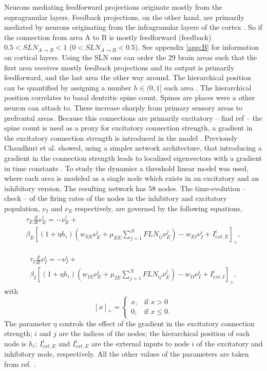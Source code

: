 Neurons mediating feedforward projections originate mostly from the supragranular layers.
Feedback projections, on the other hand, are primarily mediated by neurons originating from the infragranular layers of the cortex \cite{felleman1991distributed}. So if the connection from area A to B is mostly feedforward (feedback) $0.5 < SLN_{A\rightarrow B} < 1$ ($0 < SLN_{A\rightarrow B} <0.5$).
See appendix \ref{app:B} for information on cortical layers.
Using the SLN one can order the 29 brain areas such that the first area receives mostly feedback projections and its output is primarily feedforward, and the last area the other way around.
The hierarchical position can be quantified by assigning a number $h\in (0,1]$ each area \cite{chaudhuri2015large-scale, markov2014anatomy}.
The hierarchical position correlates to basal dentritic spine count. Spines are places were a other neuron can attach to. These  increase sharply from primary sensory areas to prefrontal areas.
Because this connections are primarily excitatory -- find ref -- the spine count is used as a proxy for excitatory connection strength, a gradient in the excitatory connection strength is introduced in the model \cite{elston2000pyramidal,elston2011pyramidal}.
Previously Chaudhuri et al. showed, using a simpler network architecture, that introducing a gradient in the connection strength leads to localized eigenvectors with a gradient in time constants \cite{chaudhuri2014diversity}.
To study the dynamics a threshold linear model was used, where each area is modeled as a single node which exists in an excitatory and an inhibitory version.
The resulting  network has 58 nodes. 
The time-evolution -- check -- of the firing rates of the nodes in the inhibitory and excitatory population, $\nu_I$ and $\nu_E$ respectively, are governed by the following equations,
\begin{multline}
\label{eq:wang_exc}
\tau_E \frac{d}{dt} \nu_E^i = - \nu_E^i + \\ \beta_E \left[ \left( 1+\eta h_i \right) \left( w_{EE} \nu_E^i + \mu_{EE} \sum_{j=1}^N FLN_{ij} \nu_E^j \right) - w_{EI} \nu_I^i+ I_{ext,E}^i \right]_+,
\end{multline}

\begin{multline}
\label{eq:wang_inh}
\tau_I \frac{d}{dt} \nu_I^i =  - \nu_I^i + \\  \beta_I \left[ \left( 1+\eta h_i \right) \left( w_{IE} \nu_E^i + \mu_{IE} \sum_{j=1}^N FLN_{ij} \nu_E^j \right) - w_{II} \nu_I^i+ I_{ext,I}^i \right]_+,
\end{multline}
with
\begin{equation*}
\left[x \right]_+ = \begin{cases}
	x, & \text{if } x>0\\
	0, & \text{if } x\leq0.
	\end{cases}
\end{equation*}
The parameter $\eta$ controls the effect of the gradient in the excitatory connection strength; $i$ and $j$ are the indices of the nodes; the hierarchical position of each node is $h_i$; $I_{ext,E}^i$ and $I_{ext,E}^i$ are the external inputs to node $i$ of the excitatory and inhibitory node, respectively.
All the other values of the parameters are taken from ref. \cite{binzegger2009topology}.

